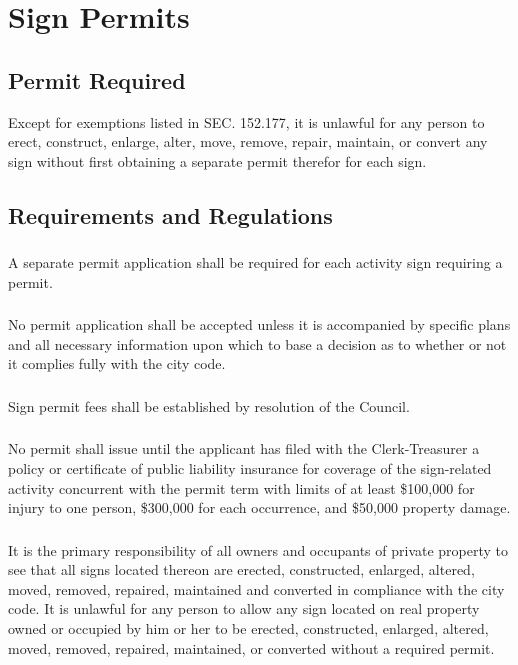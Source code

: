 \section{Sign Permits}
\subsection{Permit Required}
Except for exemptions listed in SEC. 152.177, it is unlawful for any person to erect, construct, enlarge, alter, move, remove, repair, maintain, or convert any sign without first obtaining a separate permit therefor for each sign.
\subsection{Requirements and Regulations}
\subsubsection{}
A separate permit application shall be required for each activity sign requiring a permit.
\subsubsection{}
No permit application shall be accepted unless it is accompanied by specific plans and all necessary information upon which to base a decision as to whether or not it complies fully with the city code.
\subsubsection{}
Sign permit fees shall be established by resolution of the Council.
\subsubsection{}
No permit shall issue until the applicant has filed with the Clerk-Treasurer a policy or certificate of public liability insurance for coverage of the sign-related activity concurrent with the permit term with limits of at least \$100,000 for injury to one person, \$300,000 for each occurrence, and \$50,000 property damage.
\subsubsection{}
It is the primary responsibility of all owners and occupants of private property to see that all signs located thereon are erected, constructed, enlarged, altered, moved, removed, repaired, maintained and converted in compliance with the city code.  It is unlawful for any person to allow any sign located on real property owned or occupied by him or her to be erected, constructed, enlarged, altered, moved, removed, repaired, maintained, or converted without a required permit.
